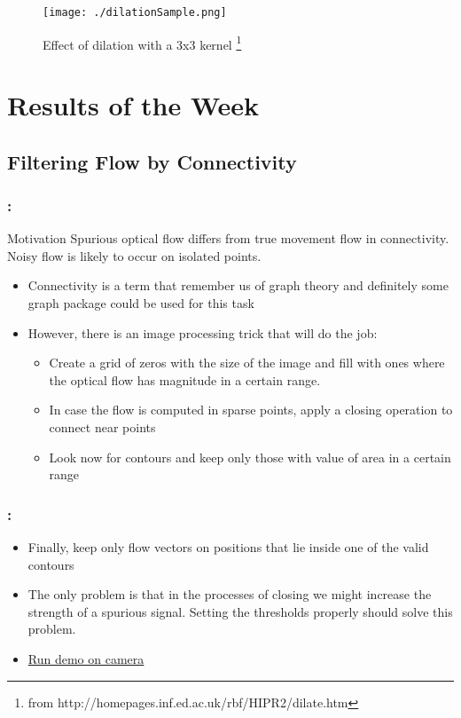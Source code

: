 \documentclass{beamer}
\begin{document}
\begin{frame}
      \begin{figure}
        \centering
        \texttt{[image: ./dilationSample.png]}
        \caption{Effect of dilation with a 3x3 kernel \footnote{from http://homepages.inf.ed.ac.uk/rbf/HIPR2/dilate.htm}}
      \end{figure}
\end{frame}
\section{Results of the Week}
\subsection{Filtering Flow by Connectivity}

\begin{frame}
  \frametitle{\secname : \subsecname}
  \begin{block}{Motivation}
    Spurious optical flow differs from true movement flow in connectivity. Noisy flow is likely to occur on isolated
    points.
  \end{block}

  \begin{itemize}
      \item Connectivity is a term that remember us of graph theory and definitely some graph package could be used for
        this task
      \item However, there is an image processing trick that will do the job:
        \begin{itemize}
            \item Create a grid of zeros with the size of the image and fill with ones where the optical flow has magnitude in a
              certain range. 
            \item In case the flow is computed in sparse points, apply a closing operation to connect near points
            \item Look now for contours and keep only those with value of area in a certain range
        \end{itemize}
  \end{itemize}
\end{frame}


\begin{frame}
  \frametitle{\secname : \subsecname}
  \begin{itemize}
        \begin{itemize}
            \item Finally, keep only flow vectors on positions that lie inside one of the valid contours
            \item The only problem is that in the processes of closing we might increase the strength of a spurious
              signal. Setting the thresholds properly should solve this problem.
            \item \href{run:runFlowFilter.sh}{Run demo on camera}
        \end{itemize}
  \end{itemize}
\end{frame}
\end{document}
